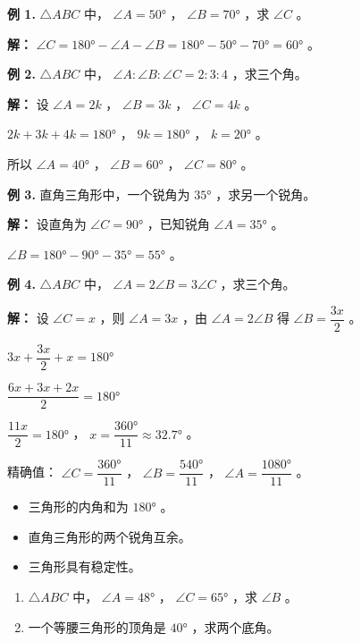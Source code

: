 \begin{workedexamples}


\textbf{例 1.} $\triangle ABC$ 中， $\angle A = 50°$ ， $\angle B = 70°$ ，求 $\angle C$ 。

\textbf{解：}
$\angle C = 180° - \angle A - \angle B = 180° - 50° - 70° = 60°$ 。

\textbf{例 2.} $\triangle ABC$ 中， $\angle A : \angle B : \angle C = 2 : 3 : 4$ ，求三个角。

\textbf{解：}
设 $\angle A = 2k$ ， $\angle B = 3k$ ， $\angle C = 4k$ 。

$2k + 3k + 4k = 180°$ ， $9k = 180°$ ， $k = 20°$ 。

所以 $\angle A = 40°$ ， $\angle B = 60°$ ， $\angle C = 80°$ 。

\textbf{例 3.} 直角三角形中，一个锐角为 $35°$ ，求另一个锐角。

\textbf{解：}
设直角为 $\angle C = 90°$ ，已知锐角 $\angle A = 35°$ 。

$\angle B = 180° - 90° - 35° = 55°$ 。

\textbf{例 4.} $\triangle ABC$ 中， $\angle A = 2\angle B = 3\angle C$ ，求三个角。

\textbf{解：}
设 $\angle C = x$ ，则 $\angle A = 3x$ ，由 $\angle A = 2\angle B$ 得 $\angle B = \dfrac{3x}{2}$ 。

$3x + \dfrac{3x}{2} + x = 180°$

$\dfrac{6x + 3x + 2x}{2} = 180°$

$\dfrac{11x}{2} = 180°$ ， $x = \dfrac{360°}{11} \approx 32.7°$ 。

精确值： $\angle C = \dfrac{360°}{11}$ ， $\angle B = \dfrac{540°}{11}$ ， $\angle A = \dfrac{1080°}{11}$ 。

\end{workedexamples}

\begin{keytakeaway}


\begin{itemize}
  \item 三角形的内角和为 $180°$ 。
  \item 直角三角形的两个锐角互余。
  \item 三角形具有稳定性。
\end{itemize}


\end{keytakeaway}

\begin{practice}


\begin{enumerate}
  \item $\triangle ABC$ 中， $\angle A = 48°$ ， $\angle C = 65°$ ，求 $\angle B$ 。
  \item 一个等腰三角形的顶角是 $40°$ ，求两个底角。
\end{enumerate}


\end{practice}



